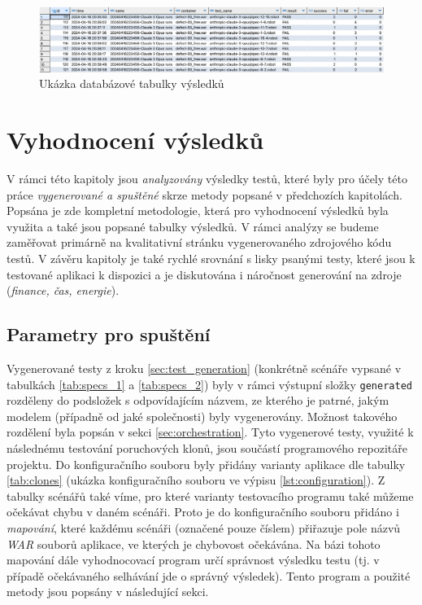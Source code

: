 \documentclass[czech, ma, kiv, he, iso690numb, pdf, viewonly]{fasthesis}
\begin{document}
    \begin{figure}
        \includegraphics[width=\textwidth]{pic/sqlite_example.png}
        \centering
        \caption{Ukázka databázové tabulky výsledků}
        \label{fig:sqlite_report}
    \end{figure}

\chapter{Vyhodnocení výsledků}

    V rámci této kapitoly jsou \emph{analyzovány} výsledky testů, které byly pro účely této práce \textit{vygenerované a spuštěné} skrze metody popsané v předchozích kapitolách. Popsána je zde kompletní metodologie, která pro vyhodnocení výsledků byla využita a také jsou popsané tabulky výsledků. V rámci analýzy se budeme zaměřovat primárně na kvalitativní stránku vygenerovaného zdrojového kódu testů. V závěru kapitoly je také rychlé srovnání s lisky psanými testy, které jsou k testované aplikaci k dispozici a je diskutována i náročnost generování na zdroje (\textit{finance, čas, energie}).

    \section{Parametry pro spuštění} \label{sec:run_parameters}

    Vygenerované testy z kroku \ref{sec:test_generation} (konkrétně scénáře vypsané v tabulkách \ref{tab:specs_1} a \ref{tab:specs_2}) byly v rámci výstupní složky \verb|generated| rozděleny do podsložek s odpovídajícím názvem, ze kterého je patrné, jakým modelem (případně od jaké společnosti) byly vygenerovány. Možnost takového rozdělení byla popsán v sekci \ref{sec:orchestration}. Tyto vygenerové testy, využité k následnému testování poruchových klonů, jsou součástí programového repozitáře projektu. Do konfiguračního souboru byly přidány varianty aplikace dle tabulky \ref{tab:clones} (ukázka konfiguračního souboru ve výpisu \ref{lst:configuration}). Z tabulky scénářů také víme, pro které varianty testovacího programu také můžeme očekávat chybu v daném scénáři. Proto je do konfiguračního souboru přidáno i \textit{mapování}, které každému scénáři (označené pouze číslem) přiřazuje pole názvů \textit{WAR} souborů aplikace, ve kterých je chybovost očekávána. Na bázi tohoto mapování dále vyhodnocovací program určí správnost výsledku testu (tj. v případě očekávaného selhávání jde o správný výsledek). Tento program a použité metody jsou popsány v následující sekci.
\end{document}
